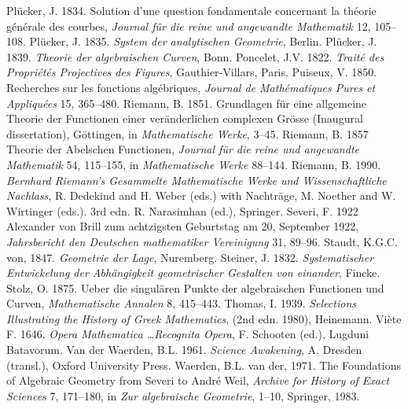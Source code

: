 \newline\indent Pl\"ucker, J. 1834. Solution d'une question fondamentale concernant la th\'eorie g\'en\'erale des courbes, \emph{Journal f\"ur die reine und angewandte Mathematik} 12, 105--108.
\newline\indent Pl\"ucker, J. 1835. \emph{System der analytischen Geometrie}, Berlin.
\newline\indent Pl\"ucker, J. 1839. \emph{Theorie der algebraischen Curven}, Bonn.
\newline\indent Poncelet, J.V. 1822. \emph{Trait\'{e} des Propri\'{e}t\'{e}s Projectives des Figures}, Gauthier-Villars, Paris.
\newline\indent Puiseux, V. 1850. Recherches sur les fonctions alg\'ebriques, \emph{Journal de Math\'ematiques Pures et Appliqu\'ees} 15, 365--480.
\newline\indent Riemann, B. 1851.  Grundlagen f\"ur eine allgemeine Theorie der Functionen einer ver\"anderlichen complexen Gr\"osse (Inaugural dissertation), G\"ottingen, in \emph{Mathematische Werke}, 3--45.
 \newline\indent Riemann, B. 1857  Theorie der Abelschen Functionen, \emph{Journal f\"ur die reine und angewandte Mathematik}  54, 115--155, in \emph{Mathematische Werke} 88--144.
 \newline\indent  Riemann, B. 1990. \emph{Bernhard Riemann's Gesammelte Mathematische Werke und Wissenschaft\-liche Nachlass}, R. Dedekind and  H. Weber (eds.)  with Nach\-tr\"age, M. Noether and W. Wirtinger (eds.). 3rd edn. R. Narasimhan (ed.), Springer.
 \newline\indent Severi, F. 1922  Alexander von Brill zum achtzigsten Geburtstag am 20, September 1922, \emph{Jahrsbericht den Deutschen mathematiker Vereinigung} 31, 89--96.
  \newline\indent Staudt, K.G.C. von, 1847. \emph{Geometrie der Lage}, Nuremberg.
\newline\indent   Steiner, J. 1832. \emph{Systematischer Entwickelung der Abh\"angigkeit geometri\-scher Gestalten von einander}, Fincke.
 \newline\indent Stolz, O.  1875. Ueber die singul\"aren Punkte der algebraischen Functionen und Curven, \emph{Mathematische Annalen} 8, 415--443. 
\newline\indent Thomas, I. 1939. \emph{Selections Illustrating the History of Greek Mathematics}, (2nd edn. 1980), Heinemann.
 \newline\indent Vi\`ete  F. 1646.  \emph{Opera Mathematica \ldots Recognita Opera}, F.  Schooten (ed.), Lugduni Batavorum.
\newline\indent Van der Waerden, B.L. 1961. \emph{Science Awakening}, A. Dresden (transl.), Oxford University Press.
\newline\indent Waerden, B.L. van der, 1971.  The Foundations of Algebraic Geometry from Severi to Andr{\'e} Weil, \emph{Archive for History of Exact Sciences} 7,  171--180, in  \emph{Zur algebraische Geometrie},  1--10, Springer, 1983.
 \normalsize
 
 
 
 
 
 







%
